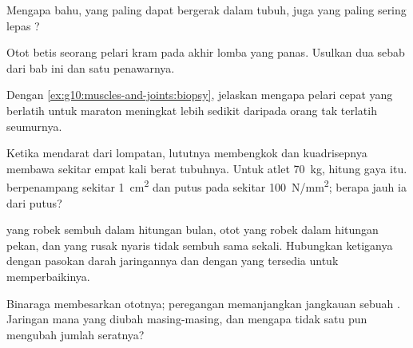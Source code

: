 \begin{exercise}[$\star\star$]\label{exo:g10:muscles-and-joints:9}
Mengapa bahu,  yang paling dapat bergerak dalam tubuh, juga yang
paling sering lepas ?
\end{exercise}

\begin{exercise}[$\star\star$]\label{exo:g10:muscles-and-joints:10}
Otot betis seorang pelari kram pada akhir lomba yang panas. Usulkan dua
sebab dari bab ini dan satu penawarnya.
\end{exercise}

\begin{exercise}[$\star\star$]\label{exo:g10:muscles-and-joints:11}
Dengan \cref{ex:g10:muscles-and-joints:biopsy}, jelaskan mengapa pelari
cepat yang berlatih untuk maraton meningkat lebih sedikit daripada
orang tak terlatih seumurnya.
\end{exercise}

\begin{exercise}[$\star\star\star$]\label{exo:g10:muscles-and-joints:12}
Ketika mendarat dari lompatan, lututnya membengkok dan 
kuadrisepnya membawa sekitar empat kali berat tubuhnya. Untuk atlet
\qty{70}{kg}, hitung gaya itu.  berpenampang sekitar
\qty{1}{cm^2} dan putus pada sekitar \qty{100}{N/mm^2}; berapa jauh ia
dari putus?
\end{exercise}

\begin{exercise}[$\star\star\star$]\label{exo:g10:muscles-and-joints:13}
 yang robek sembuh dalam hitungan bulan, otot yang robek dalam
hitungan pekan, dan  yang rusak nyaris tidak sembuh sama
sekali. Hubungkan ketiganya dengan pasokan darah jaringannya dan dengan
 yang tersedia untuk memperbaikinya.
\end{exercise}

\begin{exercise}[$\star\star\star$]\label{exo:g10:muscles-and-joints:14}
Binaraga membesarkan ototnya; peregangan memanjangkan jangkauan sebuah
. Jaringan mana yang diubah masing-masing, dan mengapa tidak satu
pun mengubah jumlah seratnya?
\end{exercise}

